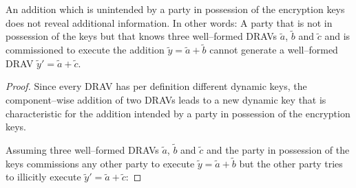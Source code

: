 \begin{lem}
  \label{lem:wrong-add}

  An addition which is unintended by a party in possession of the encryption
  keys does not reveal additional information. In other words: A party that is
  not in possession of the keys but that knows three well--formed DRAVs
  $\widetilde{a}$, $\widetilde{b}$ and $\widetilde{c}$ and is commissioned to
  execute the addition $\widetilde{y} = \widetilde{a} + \widetilde{b}$ cannot
  generate a well--formed DRAV $\widetilde{y}' = \widetilde{a} + \widetilde{c}$.

\end{lem}

\begin{proof}

  Since every DRAV has per definition different dynamic keys, the
  component--wise addition of two DRAVs leads to a new dynamic key that is
  characteristic for the addition intended by a party in possession of the
  encryption keys.

  Assuming three well--formed DRAVs $\widetilde{a}$, $\widetilde{b}$ and
  $\widetilde{c}$ and the party in possession of the keys commissions any other
  party to execute $\widetilde{y} = \widetilde{a} + \widetilde{b}$ but the other
  party tries to illicitly execute $\widetilde{y}' = \widetilde{a} +
  \widetilde{c}$:


\end{proof}
